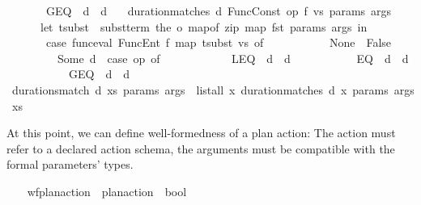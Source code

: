 \begin{isabellebody}
\ \ \ \ \ \ {\isacharbar}{\kern0pt}\ GEQ\ {\isasymRightarrow}\ d\ {\isasymge}\ d{\isacharprime}{\kern0pt}{\isacharparenright}{\kern0pt}{\isachardoublequoteclose}\isanewline
\ \ {\isacharbar}{\kern0pt}\ {\isachardoublequoteopen}duration{\isacharunderscore}{\kern0pt}matches\ d\ {\isacharparenleft}{\kern0pt}Func{\isacharunderscore}{\kern0pt}Const\ op\ f\ vs{\isacharparenright}{\kern0pt}\ params\ args\ {\isasymlongleftrightarrow}\isanewline
\ \ \ \ \ \ {\isacharparenleft}{\kern0pt}let\ tsubst\ {\isacharequal}{\kern0pt}\ subst{\isacharunderscore}{\kern0pt}term\ {\isacharparenleft}{\kern0pt}the\ o\ {\isacharparenleft}{\kern0pt}map{\isacharunderscore}{\kern0pt}of\ {\isacharparenleft}{\kern0pt}zip\ {\isacharparenleft}{\kern0pt}map\ fst\ params{\isacharparenright}{\kern0pt}\ args{\isacharparenright}{\kern0pt}{\isacharparenright}{\kern0pt}{\isacharparenright}{\kern0pt}\ in\isanewline
\ \ \ \ \ \ \ case\ func{\isacharunderscore}{\kern0pt}eval\ {\isacharparenleft}{\kern0pt}FuncEnt\ f\ {\isacharparenleft}{\kern0pt}map\ tsubst\ vs{\isacharparenright}{\kern0pt}{\isacharparenright}{\kern0pt}\ of\ \isanewline
\ \ \ \ \ \ \ \ \ \ None\ {\isasymRightarrow}\ False\ \isanewline
\ \ \ \ \ \ \ \ {\isacharbar}{\kern0pt}\ Some\ d{\isacharprime}{\kern0pt}\ {\isasymRightarrow}\ {\isacharparenleft}{\kern0pt}case\ op\ of\isanewline
\ \ \ \ \ \ \ \ \ \ \ \ LEQ\ {\isasymRightarrow}\ d\ {\isasymle}\ d{\isacharprime}{\kern0pt}\isanewline
\ \ \ \ \ \ \ \ \ \ {\isacharbar}{\kern0pt}\ EQ\ {\isasymRightarrow}\ d\ {\isacharequal}{\kern0pt}\ d{\isacharprime}{\kern0pt}\isanewline
\ \ \ \ \ \ \ \ \ \ {\isacharbar}{\kern0pt}\ GEQ\ {\isasymRightarrow}\ d\ {\isasymge}\ d{\isacharprime}{\kern0pt}{\isacharparenright}{\kern0pt}{\isacharparenright}{\kern0pt}{\isachardoublequoteclose}\isanewline
\isanewline
\ \ \isamarkupfalse%
\ {\isachardoublequoteopen}durations{\isacharunderscore}{\kern0pt}match\ d\ xs\ params\ args\ {\isacharequal}{\kern0pt}\ list{\isacharunderscore}{\kern0pt}all\ {\isacharparenleft}{\kern0pt}{\isasymlambda}x{\isachardot}{\kern0pt}\ duration{\isacharunderscore}{\kern0pt}matches\ d\ x\ params\ args{\isacharparenright}{\kern0pt}\ xs{\isachardoublequoteclose}%
\begin{isamarkuptext}%
At this point, we can define well-formedness of a plan action:
    The action must refer to a declared action schema, the arguments must
    be compatible with the formal parameters' types.%
\end{isamarkuptext}\isamarkuptrue%
\ \ \isamarkupfalse%
\ wf{\isacharunderscore}{\kern0pt}plan{\isacharunderscore}{\kern0pt}action\ {\isacharcolon}{\kern0pt}{\isacharcolon}{\kern0pt}\ {\isachardoublequoteopen}plan{\isacharunderscore}{\kern0pt}action\ {\isasymRightarrow}\ bool{\isachardoublequoteclose}\ \isanewline

\end{isabellebody}
